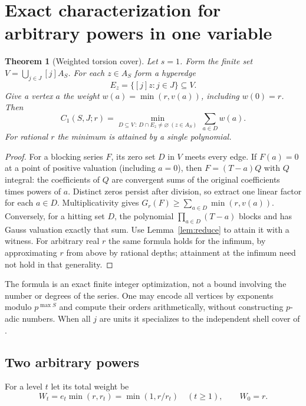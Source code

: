 \documentclass[11pt]{article}
\newtheorem{theorem}{Theorem}[section]
\theoremstyle{definition}
\begin{document}
\section{Exact characterization for arbitrary powers in one variable}

\begin{theorem}[Weighted torsion cover]\label{thm:one}
Let $s=1$. Form the finite set $V=\bigcup_{j\in J}[j]A_S$. For each $z\in A_S$ form a hyperedge
\[
 E_z=\{[j]z:j\in J\}\subseteq V.
\]
Give a vertex $a$ the weight $w(a)=\min(r,v(a))$, including $w(0)=r$. Then
\begin{equation}\label{eq:cover}
 C_1(S,J;r)=\min_{D\subseteq V\, :\, D\cap E_z\ne\varnothing\ (z\in A_S)}\ \sum_{a\in D}w(a).
\end{equation}
For rational $r$ the minimum is attained by a single polynomial.
\end{theorem}
\begin{proof}
For a blocking series $F$, its zero set $D$ in $V$ meets every edge. If $F(a)=0$ at a point of positive valuation (including $a=0$), then $F=(T-a)Q$ with $Q$ integral: the coefficients of $Q$ are convergent sums of the original coefficients times powers of $a$. Distinct zeros persist after division, so extract one linear factor for each $a\in D$. Multiplicativity gives $G_r(F)\ge\sum_{a\in D}\min(r,v(a))$. Conversely, for a hitting set $D$, the polynomial $\prod_{a\in D}(T-a)$ blocks and has Gauss valuation exactly that sum. Use Lemma~\ref{lem:reduce} to attain it with a witness. For arbitrary real $r$ the same formula holds for the infimum, by approximating $r$ from above by rational depths; attainment at the infimum need not hold in that generality.
\end{proof}

The formula is an exact finite integer optimization, not a bound involving the number or degrees of the series. One may encode all vertices by exponents modulo $p^{\max S}$ and compute their orders arithmetically, without constructing $p$-adic numbers. When all $j$ are units it specializes to the independent shell cover of \cite{tors}.

\subsection{Two arbitrary powers}
For a level $t$ let its total weight be
\begin{equation}\label{eq:weights}
 W_t=e_t\min(r,r_t)=\min(1,r/r_t)\quad(t\ge1),\qquad W_0=r.
\end{equation}
\end{document}
